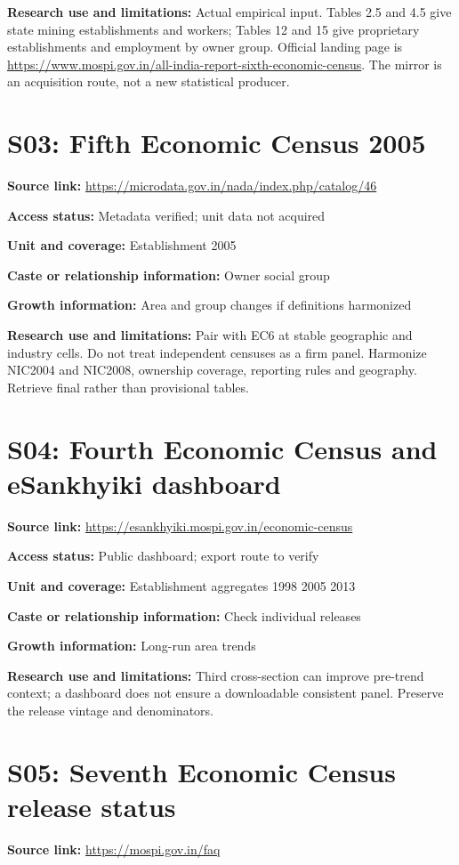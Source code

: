 \documentclass[11pt,a4paper]{report}
\begin{document}
\textbf{Research use and limitations:} Actual empirical input. Tables 2.5 and 4.5 give state mining establishments and workers; Tables 12 and 15 give proprietary establishments and employment by owner group. Official landing page is \url{https://www.mospi.gov.in/all-india-report-sixth-economic-census}. The mirror is an acquisition route, not a new statistical producer.

\section{S03: Fifth Economic Census 2005}\hypertarget{S03}{}
\textbf{Source link:} \url{https://microdata.gov.in/nada/index.php/catalog/46}

\textbf{Access status:} Metadata verified; unit data not acquired

\textbf{Unit and coverage:} Establishment 2005

\textbf{Caste or relationship information:} Owner social group

\textbf{Growth information:} Area and group changes if definitions harmonized

\textbf{Research use and limitations:} Pair with EC6 at stable geographic and industry cells. Do not treat independent censuses as a firm panel. Harmonize NIC2004 and NIC2008, ownership coverage, reporting rules and geography. Retrieve final rather than provisional tables.

\section{S04: Fourth Economic Census and eSankhyiki dashboard}\hypertarget{S04}{}
\textbf{Source link:} \url{https://esankhyiki.mospi.gov.in/economic-census}

\textbf{Access status:} Public dashboard; export route to verify

\textbf{Unit and coverage:} Establishment aggregates 1998 2005 2013

\textbf{Caste or relationship information:} Check individual releases

\textbf{Growth information:} Long-run area trends

\textbf{Research use and limitations:} Third cross-section can improve pre-trend context; a dashboard does not ensure a downloadable consistent panel. Preserve the release vintage and denominators.

\section{S05: Seventh Economic Census release status}\hypertarget{S05}{}
\textbf{Source link:} \url{https://mospi.gov.in/faq}
\end{document}
